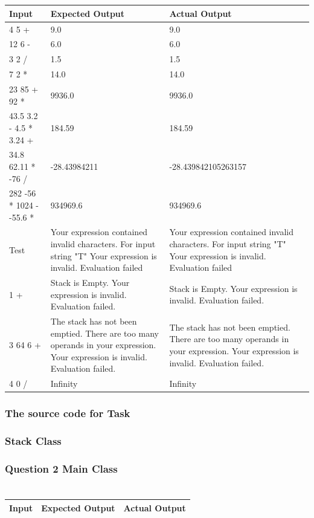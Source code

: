 \documentclass[12pt,a4paper,onesided]{report}
\renewcommand{\thesection}{Task \arabic{chapter}\alph{section}}
\newcommand{\source}{\pagebreak\subsection*{The source code for \thesection}}
\begin{document}
\chapter{}
\begin{table}[h!]
	\centering
\begin{tabular}{lp{28ex}p{28ex}}
	\toprule Input & Expected Output & Actual Output\\
	\midrule
	4 5 + & 9.0 & 9.0\\
	12 6 - & 6.0 & 6.0\\
	3 2 / & 1.5 & 1.5 \\
	7 2 * & 14.0 & 14.0\\
	23 85 + 92 * & 9936.0 & 9936.0 \\
	43.5 3.2 - 4.5 * 3.24 + & 184.59 & 184.59 \\
	34.8 62.11 * -76 / & -28.43984211 & -28.439842105263157\\
	282 -56 * 1024 - -55.6 * & 934969.6 & 934969.6\\
	Test & Your expression contained invalid characters. For input string "T" Your expression is invalid. Evaluation failed& Your expression contained invalid characters. For input string "T" Your expression is invalid. Evaluation failed\\ 
	1 + & Stack is Empty. Your expression is invalid. Evaluation failed. &  Stack is Empty. Your expression is invalid. Evaluation failed.\\
	3 64 6 + & The stack has not been emptied. There are too many operands in your expression. Your expression is invalid. Evaluation failed. & The stack has not been emptied. There are too many operands in your expression. Your expression is invalid. Evaluation failed. \\
	4 0 / & Infinity & Infinity \\
	\bottomrule
\end{tabular}
\end{table}
\source
\subsection{Stack Class}

\subsection{Question 2 Main Class}

\chapter{}
\begin{table}
	\centering
\begin{tabular}{lp{28ex}p{28ex}}
	\toprule Input & Expected Output & Actual Output\\
	\midrule
	
	\end{tabular}
\end{table}
\printbibliography[title={References}]
\end{document}
